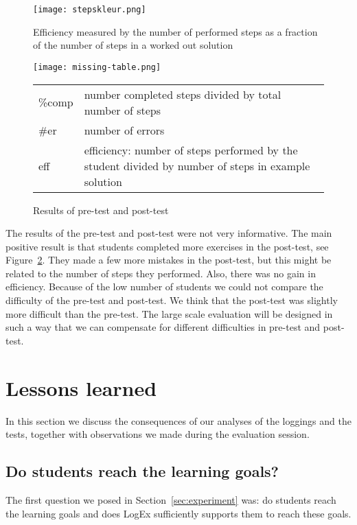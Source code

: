 \documentclass[a4paper,UKenglish]{lipics}
\begin{document}
\begin{figure}[p]
\center\texttt{[image: stepskleur.png]}
\caption{Efficiency measured by the number of performed steps as a fraction of the number of steps in a worked out solution} 
\label{steps} 
\end{figure}

\begin{figure}[t]
\center
\texttt{[image: missing-table.png]}
\caption {Results of pre-test and post-test}{
  
\footnotesize
\begin{tabular} {l  p{12cm}}
\%comp      & number completed steps divided by total number of steps \\
\#er & number of errors\\
eff    & efficiency: number of steps performed by the student divided by number of steps in example solution \\
\end{tabular}
    }
\label{testresults}
\end{figure}

The results of the pre-test and post-test were not very informative. The main
positive result is that students completed more exercises in the post-test, see
Figure~\ref{testresults}. They made a few more mistakes in the post-test, but
this might be related to the number of steps they performed. Also, there was no
gain in efficiency. Because of the low number of students we could not compare
the difficulty of the pre-test and post-test. We think that the post-test was
slightly more difficult than the pre-test. The large scale evaluation will be
designed in such a way that we can compensate for different difficulties in 
pre-test and post-test.

\section{Lessons learned}

In this section we discuss the consequences of our analyses of the loggings and
the tests, together with observations we made during the evaluation session. 
\subsection{Do students reach the learning goals?}

The first question we posed in Section~\ref{sec:experiment} was: do students reach the learning goals and does LogEx sufficiently supports them to reach these goals.
\end{document}
